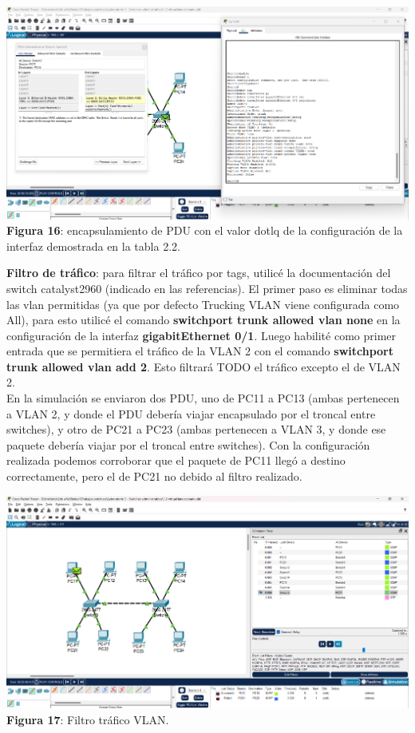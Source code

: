 \documentclass{article}
\begin{document}
    \begin{center}
        \includegraphics[width=0.775\linewidth]{img_20}  
        \linebreak
        \small {\bfseries Figura 16}: encapsulamiento de PDU con el valor dotlq de la configuración de la interfaz demostrada en la tabla 2.2.
    \end{center}

    {\bfseries Filtro de tráfico}: para filtrar el tráfico por tags, utilicé la documentación del switch catalyst2960 (indicado en las referencias). El primer paso es eliminar todas las vlan permitidas (ya que por defecto Trucking VLAN viene configurada como All), para esto utilicé el comando {\bfseries switchport trunk allowed vlan none} en la configuración de la interfaz {\bfseries gigabitEthernet 0/1}. Luego habilité como primer entrada que se permitiera el tráfico de la VLAN 2 con el comando {\bfseries switchport trunk allowed vlan add 2}. Esto filtrará TODO el tráfico excepto el de VLAN 2.\\
    En la simulación se enviaron dos PDU, uno de PC11 a PC13 (ambas pertenecen a VLAN 2, y donde el PDU debería viajar encapsulado por el troncal entre switches), y otro de PC21 a PC23 (ambas pertenecen a VLAN 3, y donde ese paquete debería viajar por el troncal entre switches). Con la configuración realizada podemos corroborar que el paquete de PC11 llegó a destino correctamente, pero el de PC21 no debido al filtro realizado.\\

    \begin{center}
        \includegraphics[width=0.775\linewidth]{img_21}  
        \linebreak
        \small {\bfseries Figura 17}: Filtro tráfico VLAN.
    \end{center}
\end{document}
